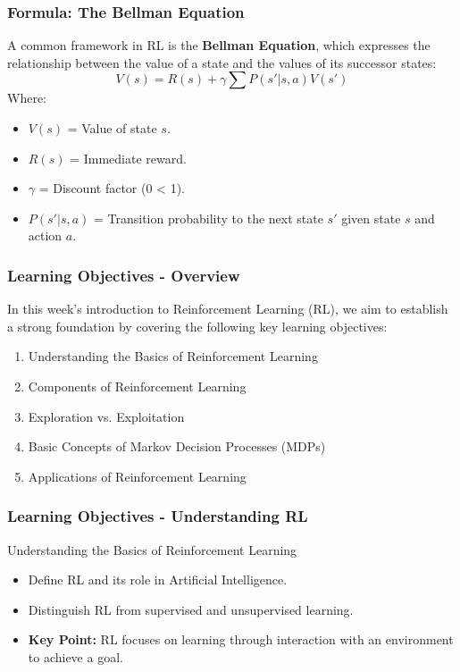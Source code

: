 \documentclass{beamer}
\begin{document}
\begin{frame}[fragile]
    \frametitle{Formula: The Bellman Equation}
    A common framework in RL is the \textbf{Bellman Equation}, which expresses the relationship between the value of a state and the values of its successor states:
    \begin{equation}
        V(s) = R(s) + \gamma \sum P(s'|s,a)V(s')
    \end{equation}
    Where:
    \begin{itemize}
        \item \( V(s) \) = Value of state \( s \).
        \item \( R(s) \) = Immediate reward.
        \item \( \gamma \) = Discount factor (0 \leq \gamma < 1).
        \item \( P(s'|s,a) \) = Transition probability to the next state \( s' \) given state \( s \) and action \( a \).
    \end{itemize}
\end{frame}

\begin{frame}[fragile]
    \frametitle{Learning Objectives - Overview}
    In this week’s introduction to Reinforcement Learning (RL), we aim to establish a strong foundation by covering the following key learning objectives:
    
    \begin{enumerate}
        \item Understanding the Basics of Reinforcement Learning
        \item Components of Reinforcement Learning
        \item Exploration vs. Exploitation
        \item Basic Concepts of Markov Decision Processes (MDPs)
        \item Applications of Reinforcement Learning
    \end{enumerate}
\end{frame}

\begin{frame}[fragile]
    \frametitle{Learning Objectives - Understanding RL}
    \begin{block}{Understanding the Basics of Reinforcement Learning}
        \begin{itemize}
            \item Define RL and its role in Artificial Intelligence.
            \item Distinguish RL from supervised and unsupervised learning.
            \item \textbf{Key Point:} RL focuses on learning through interaction with an environment to achieve a goal.
        \end{itemize}
    \end{block}
\end{frame}
\end{document}

